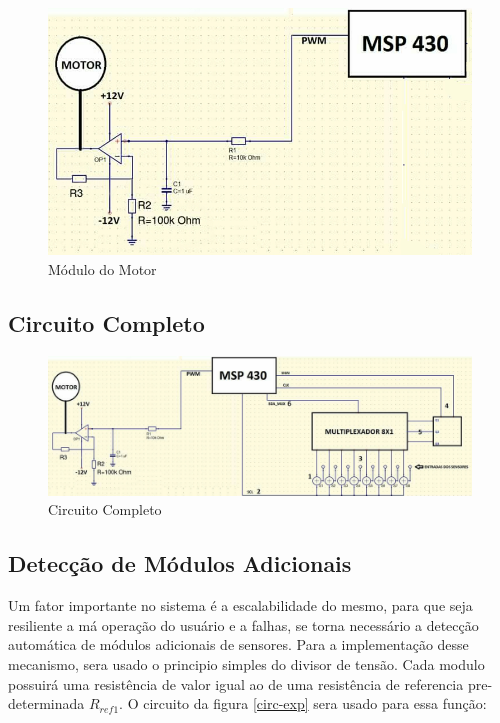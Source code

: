 \begin{figure}[htbp]
    \centering
        \includegraphics[scale=0.6]{figuras/mod_motor.png}
    \caption{Módulo do Motor}
    \label{mod_motor}
\end{figure}


\subsection*{Circuito Completo}

\begin{figure}[htbp]
    \centering
        \includegraphics[scale=0.2]{figuras/mod_completo.png}
    \caption{Circuito Completo}
    \label{mod_completo}
\end{figure}

\subsection*{Detecção de Módulos Adicionais}

Um fator importante no sistema é a escalabilidade do mesmo, para que seja resiliente a má operação do usuário e a falhas, se torna necessário a detecção automática de módulos adicionais de sensores. Para a implementação desse mecanismo, sera usado o principio simples do divisor de tensão. Cada modulo possuirá uma resistência de valor igual ao de uma resistência de referencia pre-determinada $R_{ref1}$. O circuito da figura \ref{circ-exp} sera usado para essa função:

